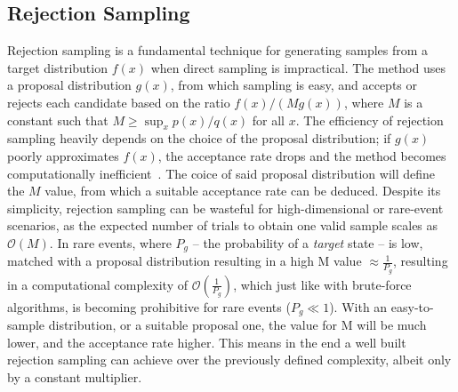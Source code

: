 \documentclass[encoding=utf8,british]{tumphthesis}
\begin{document}
        \subsection{Rejection Sampling}
            Rejection sampling is a fundamental technique for generating samples from a target distribution $f(x)$ when direct sampling is 
            impractical. The method uses a proposal distribution $g(x)$, from which sampling is easy, and accepts or rejects each candidate 
            based on the ratio $f(x)/(M g(x))$, where $M$ is a constant such that $M \geq \sup_x p(x)/q(x)$ for all $x$. The efficiency of 
            rejection sampling heavily depends on the choice of the proposal distribution; if $g(x)$ poorly approximates $f(x)$, the 
            acceptance rate drops and the method becomes computationally inefficient~\cite{Lee2025}. The coice of said proposal distribution will define the $M$
            value, from which a suitable acceptance rate can be deduced. Despite its simplicity, rejection sampling can be wasteful for 
            high-dimensional or rare-event scenarios, as the expected number of trials to obtain one valid sample scales as $\mathcal{O}(M)$. 
            In rare events, where $P_g$ -- the probability of a \textit{target} state -- is low, matched with a proposal distribution resulting in a 
            high M value $\approx \frac{1}{P_g}$, resulting in a computational complexity of $\mathcal{O}(\frac{1}{P_g})$, which just like with brute-force 
            algorithms, is becoming prohibitive for rare events ($P_g \ll 1$). With an easy-to-sample distribution, or a suitable proposal one, the value for 
            M will be much lower, and the acceptance rate higher. This means in the end a well built rejection sampling can achieve over the previously 
            defined complexity, albeit only by a constant multiplier. 
\end{document}
